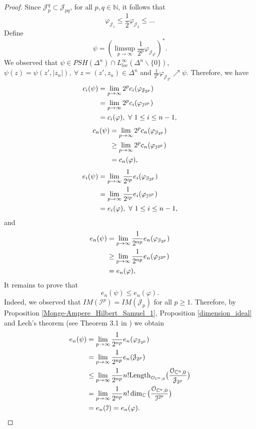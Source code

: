 \documentclass[a4paper,oneside,reqno,11pt]{article}
\begin{document}
\begin{proof}
Since $\mathcal {J}_p^q\subset \mathcal {J}_{ p q }$, for all $p,q\in\mathbb N$, it follows that 
$$\varphi_{ \mathcal J_1 }\leq \frac { 1 } { 2} \varphi_{ \mathcal {J}_{ 2 } }\leq ...$$
Define
$$\psi = ( \limsup\limits_{ p\to\infty } \frac { 1 } { 2^p } \varphi_{ \mathcal J_{ 2^p } } )^{ * }.$$
We observed that $\psi\in PSH ( \Delta^n )\cap L_{ loc }^{ \infty } ( \Delta^n\backslash \{ 0 \} )$, $\psi ( z ) = \psi ( z' , | z_n | ),\ \forall\ z = ( z' , z_n )\in \Delta^n$ and $\frac { 1 } { 2^p } \varphi_{ \mathcal J_{ 2^p } }\nearrow\psi$. Therefore, we have
$$\aligned 
c_i ( \psi ) &= \lim\limits_{ p\to\infty } 2^p  c_i ( \varphi_{\mathcal J_{ 2^p } } )\\
&= \lim\limits_{ p\to\infty } 2^p  c_i ( \varphi_{ \mathcal {I}^{ 2^p } } )\\
&= c_i ( \varphi ),\ \forall\ 1\leq i\leq n - 1,
\endaligned$$
$$\aligned 
c_n ( \psi ) &= \lim\limits_{ p\to\infty } 2^p  c_n( \varphi_{\mathcal {J}_{ 2^p } } )\\
&\geq \lim\limits_{ p\to\infty } 2^p  c_n ( \varphi_{ \mathcal {I}^{ 2^p } } )\\
&= c_n ( \varphi ),
\endaligned$$
$$\aligned 
e_i ( \psi ) &= \lim\limits_{ p\to\infty } \frac { 1 } { 2^{ ip } }  e_i ( \varphi_{\mathcal {J}_{ 2^p } } )\\
&= \lim\limits_{ p\to\infty } \frac { 1 } { 2^{ ip } } e_i ( \varphi_{ \mathcal {I}^{ 2^p } } )\\
&= e_i ( \varphi ),\ \forall\ 1\leq i\leq n - 1,
\endaligned$$
and 
$$\aligned 
e_n ( \psi ) &= \lim\limits_{ p\to\infty } \frac { 1 } { 2^{ np } }  e_n ( \varphi_{\mathcal {J}_{ 2^p } } )\\
&\geq\lim\limits_{ p\to\infty } \frac { 1 } { 2^{ np } } e_n ( \varphi_{ \mathcal {I}^{ 2^p } } )\\
&= e_n ( \varphi ),
\endaligned$$
It remains to prove that
$$e_n ( \psi )\leq e_n ( \varphi ).$$
Indeed, we observed that $IM ( \mathcal I^{ p } ) = IM ( \mathcal J_{ p } )$ for all $p\geq 1$. Therefore, by Proposition \ref{Monge-Ampere_Hilbert_Samuel_1}, Proposition \ref{dimension_ideal} and Lech's theorem (see Theorem 3.1 in \cite{Le60}) we obtain 
$$\aligned
e_n (\psi ) &= \lim\limits_{ p\to\infty } \frac { 1 } { 2^{ np } } e_n ( \varphi_{ \mathcal {J}_{ 2^p } } )\\
&=\lim\limits_{ p\to\infty } \frac { 1 } { 2^{ np } } e_n ( \mathcal {J}_{ 2^p } )\\
&\leq\lim\limits_{ p\to\infty } \frac { 1 } { 2^{ np } } n! \text{Length}_{ \mathcal{O}_{ \mathbb C^n, 0 } } \big( \frac { \mathcal{O}_{ \mathbb C^n, 0 } } { \mathcal {J}_{ 2^p } } \big)\\
&=\lim\limits_{ p\to\infty } \frac { 1 } { 2^{ np } } n! \dim_{ \mathbb C } \big( \frac { \mathcal{O}_{ \mathbb C^n, 0 } } { \mathcal {I}^{ 2^p } } \big)\\
&=e_n ( \mathcal {I} ) = e_n ( \varphi ).
\endaligned$$
\end{proof}
\end{document}
